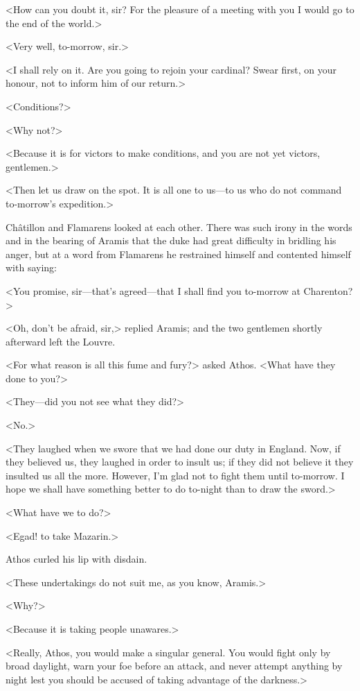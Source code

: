 <How can you doubt it, sir? For the pleasure of a meeting with you I would go to the end of the world.>

<Very well, to-morrow, sir.>

<I shall rely on it. Are you going to rejoin your cardinal? Swear first, on your honour, not to inform him of our return.>

<Conditions?>

<Why not?>

<Because it is for victors to make conditions, and you are not yet victors, gentlemen.>

<Then let us draw on the spot. It is all one to us—to us who do not command to-morrow's expedition.>

Châtillon and Flamarens looked at each other. There was such irony in the words and in the bearing of Aramis that the duke had great difficulty in bridling his anger, but at a word from Flamarens he restrained himself and contented himself with saying:

<You promise, sir—that's agreed—that I shall find you to-morrow at Charenton?>

<Oh, don't be afraid, sir,> replied Aramis; and the two gentlemen shortly afterward left the Louvre.

<For what reason is all this fume and fury?> asked Athos. <What have they done to you?>

<They—did you not see what they did?>

<No.>

<They laughed when we swore that we had done our duty in England. Now, if they believed us, they laughed in order to insult us; if they did not believe it they insulted us all the more. However, I'm glad not to fight them until to-morrow. I hope we shall have something better to do to-night than to draw the sword.>

<What have we to do?>

<Egad! to take Mazarin.>

Athos curled his lip with disdain.

<These undertakings do not suit me, as you know, Aramis.>

<Why?>

<Because it is taking people unawares.>

<Really, Athos, you would make a singular general. You would fight only by broad daylight, warn your foe before an attack, and never attempt anything by night lest you should be accused of taking advantage of the darkness.>

